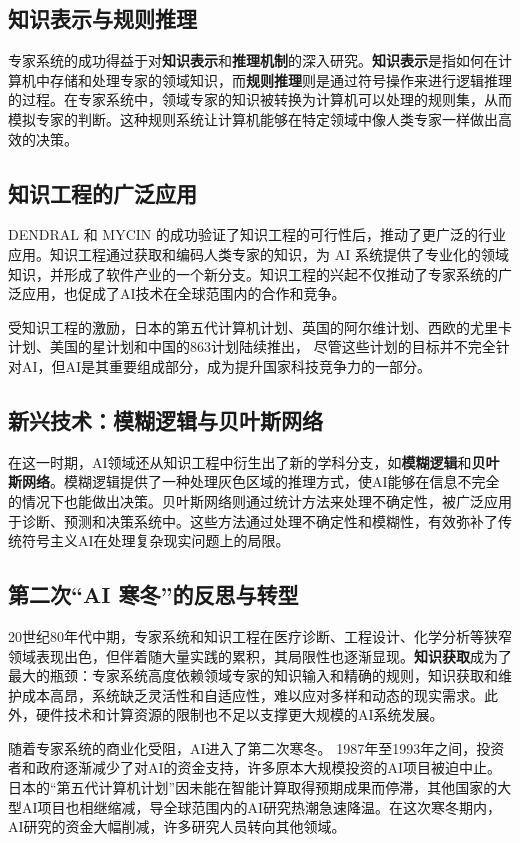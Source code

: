 \subsection{知识表示与规则推理}
专家系统的成功得益于对{\bf 知识表示}和{\bf 推理机制}的深入研究。{\bf 知识表示}是指如何在计算机中存储和处理专家的领域知识，而{\bf 规则推理}则是通过符号操作来进行逻辑推理的过程。在专家系统中，领域专家的知识被转换为计算机可以处理的规则集，从而模拟专家的判断。这种规则系统让计算机能够在特定领域中像人类专家一样做出高效的决策。

\subsection{ 知识工程的广泛应用}
DENDRAL 和 MYCIN 的成功验证了知识工程的可行性后，推动了更广泛的行业应用。知识工程通过获取和编码人类专家的知识，为 AI 系统提供了专业化的领域知识，并形成了软件产业的一个新分支。知识工程的兴起不仅推动了专家系统的广泛应用，也促成了AI技术在全球范围内的合作和竞争。

受知识工程的激励，日本的第五代计算机计划、英国的阿尔维计划、西欧的尤里卡计划、美国的星计划和中国的863计划陆续推出，
尽管这些计划的目标并不完全针对AI，但AI是其重要组成部分，成为提升国家科技竞争力的一部分。

\subsection{新兴技术：模糊逻辑与贝叶斯网络}
在这一时期，AI领域还从知识工程中衍生出了新的学科分支，如{\bf 模糊逻辑}和{\bf 贝叶斯网络}。模糊逻辑提供了一种处理灰色区域的推理方式，使AI能够在信息不完全的情况下也能做出决策。贝叶斯网络则通过统计方法来处理不确定性，被广泛应用于诊断、预测和决策系统中。这些方法通过处理不确定性和模糊性，有效弥补了传统符号主义AI在处理复杂现实问题上的局限。

\subsection{第二次“AI 寒冬”的反思与转型}
20世纪80年代中期，专家系统和知识工程在医疗诊断、工程设计、化学分析等狭窄领域表现出色，但伴着随大量实践的累积，其局限性也逐渐显现。{\bf 知识获取}成为了最大的瓶颈：专家系统高度依赖领域专家的知识输入和精确的规则，知识获取和维护成本高昂，系统缺乏灵活性和自适应性，难以应对多样和动态的现实需求。此外，硬件技术和计算资源的限制也不足以支撑更大规模的AI系统发展。

随着专家系统的商业化受阻，AI进入了第二次寒冬。
1987年至1993年之间，投资者和政府逐渐减少了对AI的资金支持，许多原本大规模投资的AI项目被迫中止。日本的“第五代计算机计划”因未能在智能计算取得预期成果而停滞，其他国家的大型AI项目也相继缩减，导全球范围内的AI研究热潮急速降温。在这次寒冬期内，AI研究的资金大幅削减，许多研究人员转向其他领域。


